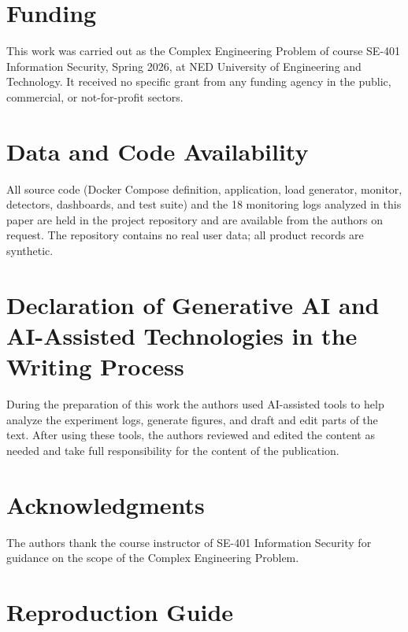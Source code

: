 \documentclass[preprint,12pt]{elsarticle}
\begin{document}
\section*{Funding}
This work was carried out as the Complex Engineering Problem of course SE-401
Information Security, Spring 2026, at NED University of Engineering and Technology. It
received no specific grant from any funding agency in the public, commercial, or
not-for-profit sectors.

\section*{Data and Code Availability}
All source code (Docker Compose definition, application, load generator, monitor,
detectors, dashboards, and test suite) and the 18 monitoring logs analyzed in this paper
are held in the project repository and are available from the authors on request. The
repository contains no real user data; all product records are synthetic.

\section*{Declaration of Generative AI and AI-Assisted Technologies in the Writing Process}
During the preparation of this work the authors used AI-assisted tools to help analyze
the experiment logs, generate figures, and draft and edit parts of the text. After
using these tools, the authors reviewed and edited the content as needed and take full
responsibility for the content of the publication.

\section*{Acknowledgments}
The authors thank the course instructor of SE-401 Information Security for guidance on
the scope of the Complex Engineering Problem.





\clearpage
\appendix

\section{Reproduction Guide}
\label{app:repro}
\end{document}
